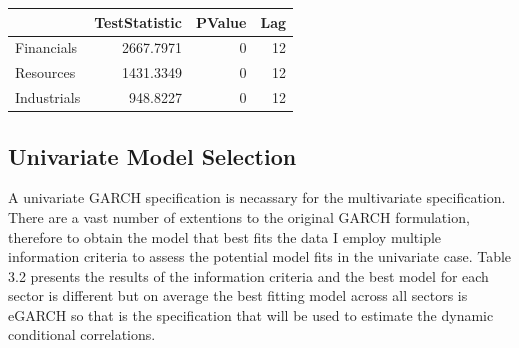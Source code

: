 \documentclass[11pt,preprint, authoryear]{elsarticle}
\let\origtable\table
\let\endorigtable\endtable
\renewenvironment{table}[1][2] {
    \expandafter\origtable\expandafter[H]
} {
    \endorigtable
}
\numberwithin{equation}{section}
\numberwithin{figure}{section}
\numberwithin{table}{section}
\begin{document}
\begin{table}

\caption{\label{tab:unnamed-chunk-5}Ljung-Box Test Results}
\centering
\begin{tabular}[t]{l|r|r|r}
\hline
  & TestStatistic & PValue & Lag\\
\hline
Financials & 2667.7971 & 0 & 12\\
\hline
Resources & 1431.3349 & 0 & 12\\
\hline
Industrials & 948.8227 & 0 & 12\\
\hline
\end{tabular}
\end{table}

\hypertarget{univariate-model-selection}{%
\subsection{Univariate Model
Selection}\label{univariate-model-selection}}

A univariate GARCH specification is necassary for the multivariate
specification. There are a vast number of extentions to the original
GARCH formulation, therefore to obtain the model that best fits the data
I employ multiple information criteria to assess the potential model
fits in the univariate case. Table 3.2 presents the results of the
information criteria and the best model for each sector is different but
on average the best fitting model across all sectors is eGARCH so that
is the specification that will be used to estimate the dynamic
conditional correlations.
\end{document}
